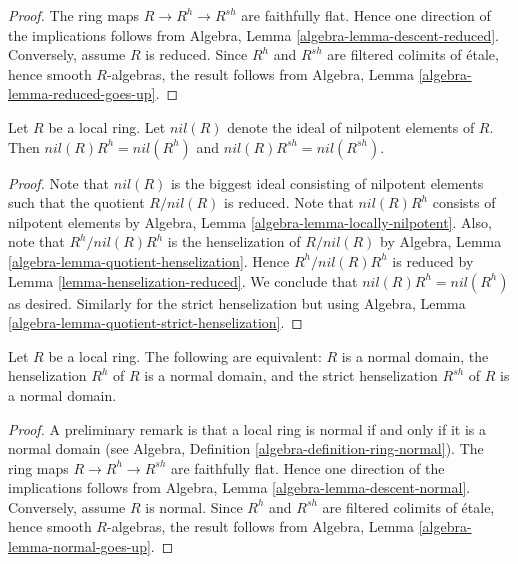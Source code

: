 \begin{proof}
The ring maps $R \to R^h \to R^{sh}$ are faithfully flat.
Hence one direction of the implications follows from
Algebra, Lemma \ref{algebra-lemma-descent-reduced}.
Conversely, assume $R$ is reduced. Since $R^h$ and $R^{sh}$
are filtered colimits of \'etale, hence smooth $R$-algebras, the
result follows from
Algebra, Lemma \ref{algebra-lemma-reduced-goes-up}.
\end{proof}

\begin{lemma}
\label{lemma-henselization-nil}
Let $R$ be a local ring. Let $nil(R)$ denote the ideal of
nilpotent elements of $R$. Then $nil(R)R^h = nil(R^h)$ and
$nil(R)R^{sh} = nil(R^{sh})$.
\end{lemma}

\begin{proof}
Note that $nil(R)$ is the biggest ideal consisting of nilpotent elements
such that the quotient $R/nil(R)$ is reduced. Note that $nil(R)R^h$
consists of nilpotent elements by
Algebra, Lemma \ref{algebra-lemma-locally-nilpotent}.
Also, note that $R^h/nil(R) R^h$ is the
henselization of $R/nil(R)$ by
Algebra, Lemma \ref{algebra-lemma-quotient-henselization}.
Hence $R^h/nil(R)R^h$ is reduced by
Lemma \ref{lemma-henselization-reduced}.
We conclude that $nil(R) R^h = nil(R^h)$ as desired.
Similarly for the strict henselization but using
Algebra, Lemma \ref{algebra-lemma-quotient-strict-henselization}.
\end{proof}

\begin{lemma}
\label{lemma-henselization-normal}
Let $R$ be a local ring.
The following are equivalent: $R$ is a normal domain,
the henselization $R^h$ of $R$ is a normal domain, and
the strict henselization $R^{sh}$ of $R$ is a normal domain.
\end{lemma}

\begin{proof}
A preliminary remark is that a local ring is normal if and only if it is
a normal domain (see
Algebra, Definition \ref{algebra-definition-ring-normal}).
The ring maps $R \to R^h \to R^{sh}$ are faithfully flat.
Hence one direction of the implications follows from
Algebra, Lemma \ref{algebra-lemma-descent-normal}.
Conversely, assume $R$ is normal. Since $R^h$ and $R^{sh}$
are filtered colimits of \'etale, hence smooth $R$-algebras, the
result follows from
Algebra, Lemma \ref{algebra-lemma-normal-goes-up}.
\end{proof}


